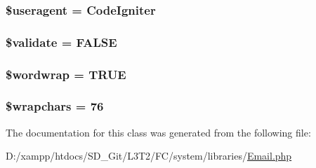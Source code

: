 \subsubsection[{\$useragent}]{\setlength{\rightskip}{0pt plus 5cm}\$useragent = \textquotesingle{}Code\+Igniter\textquotesingle{}}\label{class_c_i___email_adc6d59b7c0768eeffafe3b78c4836959}
\hypertarget{class_c_i___email_a320b75b46e1832c327d9d47b4cea9e7d}{}
\subsubsection[{\$validate}]{\setlength{\rightskip}{0pt plus 5cm}\$validate = F\+A\+L\+S\+E}\label{class_c_i___email_a320b75b46e1832c327d9d47b4cea9e7d}
\hypertarget{class_c_i___email_abc150a71df67310da874f7399ab5f2cd}{}
\subsubsection[{\$wordwrap}]{\setlength{\rightskip}{0pt plus 5cm}\$wordwrap = T\+R\+U\+E}\label{class_c_i___email_abc150a71df67310da874f7399ab5f2cd}
\hypertarget{class_c_i___email_a8834e27a87a8b935ab1155d1d7bd44d2}{}
\subsubsection[{\$wrapchars}]{\setlength{\rightskip}{0pt plus 5cm}\$wrapchars = 76}\label{class_c_i___email_a8834e27a87a8b935ab1155d1d7bd44d2}


The documentation for this class was generated from the following file\+:\begin{DoxyCompactItemize}
\item 
D\+:/xampp/htdocs/\+S\+D\+\_\+\+Git/\+L3\+T2/\+F\+C/system/libraries/\hyperlink{_email_8php}{Email.\+php}\end{DoxyCompactItemize}
